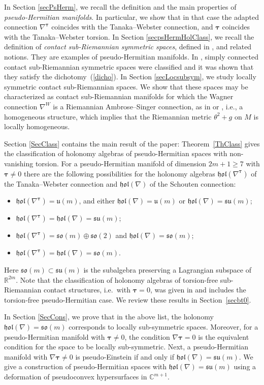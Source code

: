 \documentclass{amsart}
\theoremstyle{plain}
\theoremstyle{definition}
\def\so{\mathfrak{so}}
\def\su{\mathfrak{su}}
\def\u{\mathfrak{u}}
\newcommand{\hol}{\mathfrak{hol}}
\newcommand{\bt}{{\boldsymbol{\tau}}}
\newcommand{\Real}{\mathbb{R}}
\newcommand{\Co}{\mathbb{C}}
\newcommand{\1}{\mathbf{1}}
\newcommand{\+}{\oplus}
\begin{document}
In Section \ref{secPsHerm}, we recall the definition and the main properties of {\em pseudo-Hermitian manifolds}. In particular, we show that in that case the adapted connection $\nabla^\bt$ coincides with the Tanaka--Webster connection, and $\bt$ coincides with the Tanaka--Webster torsion. In Section \ref{secpsHermHolClass}, we recall the definition of {\em contact sub-Riemannian symmetric spaces},  defined in \cite{FG}, and related notions.  They are examples of pseudo-Hermitian manifolds. In \cite{BFG,FG,FGR}, simply connected contact sub-Riemannian symmetric spaces were classified and  it was shown that they satisfy the dichotomy~(\ref{dicho}). In Section \ref{secLocsubsym}, we study locally symmetric
contact sub-Riemannian spaces. We show that these spaces may be characterized as contact sub-Riemannian manifolds for which the  Wagner connection $\nabla^W$ is a Riemannian  Ambrose--Singer connection, as in \cite{AmbroseSinger58} or \cite{tricerri-vanhecke83},  i.e., a homogeneous structure, which implies that the Riemannian metric $\theta^2+g$ on $M$ is locally homogeneous. 

Section \ref{SecClass} contains the main result of the paper: Theorem~\ref{ThClass} gives the classification of holonomy algebras of pseudo-Hermitian spaces with non-vanishing torsion. 
For a pseudo-Hermitian manifold of dimension $2m+1\geq 7$ with $\bt\neq 0$
there are the following possibilities for the  holonomy algebras $\hol(\nabla^{\bt})$ of the Tanaka--Webster connection and $\hol(\nabla)$ of the Schouten connection:
\begin{itemize}
	\item[ 1.] $\hol(\nabla^{\bt})=\u(m)$, and either $\hol(\nabla)=\u(m)$ or $\hol(\nabla)=\su(m)$;
	\item[ 2.] $\hol(\nabla^{\bt})=\hol(\nabla)=\su(m)$;
	\item[ 3.] $\hol(\nabla^{\bt})=\so(m)\oplus\so(2)$ and $\hol(\nabla)=\so(m)$; 
	\item[ 4.] $\hol(\nabla^{\bt})=\hol(\nabla)=\so(m)$.
\end{itemize}
Here $\so(m)\subset\su(m)$ is the subalgebra preserving a Lagrangian subspace of $\Real^{2m}$. Note that the classification of holonomy algebras of torsion-free sub-Riemannian contact structures, i.e.~with $\bt=0$,   was given in \cite{GalHolK} and includes the torsion-free pseudo-Hermitian case. We review  these results  in Section~\ref{secbt0}.

In Section \ref{SecCons}, we prove that in the above list, the holonomy 
$\hol(\nabla)=\so(m)$ corresponds to locally sub-symmetric spaces. Moreover, for a pseudo-Hermitian manifold with $\bt\neq 0$,  the condition $\nabla\bt=0$ is the equivalent condition for the space to be locally sub-symmetric. Next, a pseudo-Hermitian manifold with $\nabla\bt\neq 0$ is pseudo-Einstein if and only if  $\hol(\nabla)=\su(m)$. We give a construction of pseudo-Hermitian spaces with $\hol(\nabla)=\su(m)$ using a deformation of pseudoconvex hypersurfaces in $\Co^{m+1}$.
\end{document}
